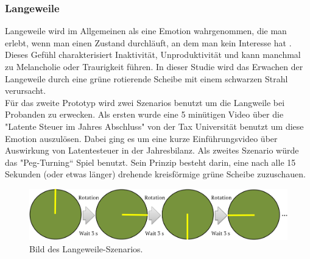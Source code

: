 \subsubsection{Langeweile} \label{langeweile-1}


Langeweile wird im Allgemeinen als eine Emotion wahrgenommen, die man erlebt, wenn man einen Zustand durchl{\"a}uft, an dem man kein Interesse hat \cite{vodanovich_2003}. 
Dieses Gef{\"u}hl charakterisiert Inaktivit{\"a}t, Unproduktivit{\"a}t und kann manchmal zu Melancholie oder Traurigkeit f{\"u}hren.
In dieser Studie wird das Erwachen der Langeweile durch eine gr{\"u}ne rotierende Scheibe mit einem schwarzen Strahl verursacht. \\

F{\"u}r das zweite Prototyp wird zwei Szenarios benutzt um die Langweile bei Probanden zu erwecken.
Als ersten wurde eine 5 min{\"u}tigen Video {\"u}ber die "Latente Steuer im Jahres Abschluss" von der Tax Universit{\"a}t benutzt um diese Emotion auszul{\"o}sen. Dabei ging es um eine kurze Einf{\"u}hrungsvideo {\"u}ber Auswirkung von Latentesteuer in der Jahresbilanz. 
Als zweites Szenario w{\"u}rde das "Peg-Turning“ Spiel benutzt. Sein Prinzip besteht darin, eine nach alle 15 Sekunden (oder etwas l{\"a}nger) drehende kreisf{\"o}rmige gr{\"u}ne Scheibe zuzuschauen.


\begin{figure}[H] \centering
\includegraphics[width=\textwidth]{Images/boredom_game2.png} 
\vspace{-0.3cm} 
\caption{Bild des Langeweile-Szenarios.}
\label{fig-glueck} 
\end{figure}

